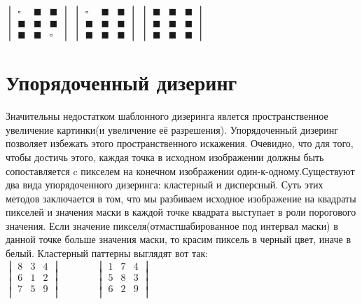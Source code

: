 $\begin{vmatrix}
\square&\blacksquare&\blacksquare \\
\blacksquare &\blacksquare&\blacksquare \\
\blacksquare &\blacksquare&\square 
\end{vmatrix}$ 	 
$\begin{vmatrix}
\square&\blacksquare&\blacksquare \\
\blacksquare &\blacksquare&\blacksquare \\
\blacksquare &\blacksquare&\blacksquare 
\end{vmatrix}$ 
$\begin{vmatrix}
\blacksquare&\blacksquare&\blacksquare \\
\blacksquare &\blacksquare&\blacksquare \\
\blacksquare &\blacksquare&\blacksquare 
\end{vmatrix}$ 


\section{Упорядоченный дизеринг}
Значительны недостатком шаблонного дизеринга явлется пространственное увеличение картинки(и увеличение её разрешения). Упорядоченный дизеринг позволяет избежать этого пространственного искажения. Очевидно, что для того, чтобы достичь этого, каждая точка в исходном изображении должны быть сопоставляется c пикселем на конечном изображении  один-к-одному.Существуют два вида упорядоченного дизеринга: кластерный и дисперсный.
Суть этих методов заключается в том, что мы разбиваем исходное изображение на квадраты пикселей и значения маски в каждой точке квадрата выступает в роли порогового значения. Если значение пикселя(отмастшабированное под интервал маски) в данной точке больше значения маски, то красим пиксель в черный цвет, иначе в белый. Кластерный паттерны выглядят вот так:\\
$\begin{vmatrix}
8&  3 & 4  \\                      
6&  1&  2   \\                 
7 & 5 & 9  \\
\end{vmatrix}    $   ~    ~  ~  ~        
$\begin{vmatrix}
1 &  7 & 4 \\
5 & 8 & 3 \\
6 & 2 & 9 \\
\end{vmatrix}$


